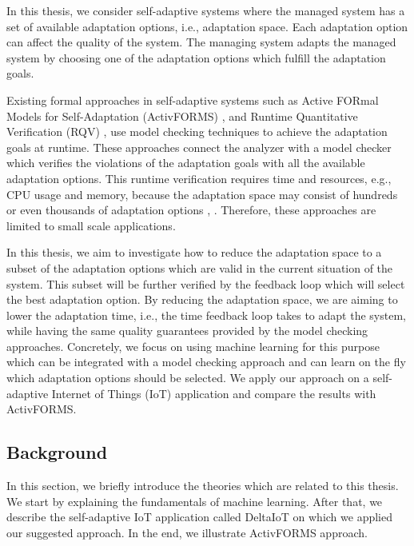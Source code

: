 \documentclass[a4paper,12pt]{article}
\begin{document}
In this thesis, we consider self-adaptive systems where the managed system has a set of available adaptation options, i.e., adaptation space. Each adaptation option can affect the quality of the system. The managing system adapts the managed system by choosing one of the adaptation options which fulfill the adaptation goals.

Existing formal approaches in self-adaptive systems such as Active FORmal Models for Self-Adaptation (ActivFORMS) \cite{ACTIVFORMS-2014}, \cite{TRSMCFSAS-2016} and Runtime Quantitative Verification (RQV) \cite{SASNQVAR-2012}, \cite{ETSASWDAC-2017} use model checking techniques to achieve the adaptation goals at runtime. These approaches connect the analyzer with a model checker which verifies the violations of the adaptation goals with all the available adaptation options. This runtime verification requires time and resources, e.g., CPU usage and memory, because the adaptation space may consist of hundreds or even thousands of adaptation options \cite{TLFIMPIHCS-2017}, \cite{DQMAOISBS-2011}. Therefore, these approaches are limited to small scale applications.

In this thesis, we aim to investigate how to reduce the adaptation space to a subset of the adaptation options which are valid in the current situation of the system. This subset will be further verified by the feedback loop which will select the best adaptation option. By reducing the adaptation space, we are aiming to lower the adaptation time, i.e., the time feedback loop takes to adapt the system, while having the same quality guarantees provided by the model checking approaches. Concretely, we focus on using machine learning for this purpose which can be integrated with a model checking approach and can learn on the fly which adaptation options should be selected. We apply our approach on a self-adaptive Internet of Things (IoT) application and compare the results with ActivFORMS.
\subsection{Background}
In this section, we briefly introduce the theories which are related to this thesis. We start by explaining the fundamentals of machine learning. After that, we describe the self-adaptive IoT application called DeltaIoT on which we applied our suggested approach. In the end, we illustrate ActivFORMS approach.
\end{document}
